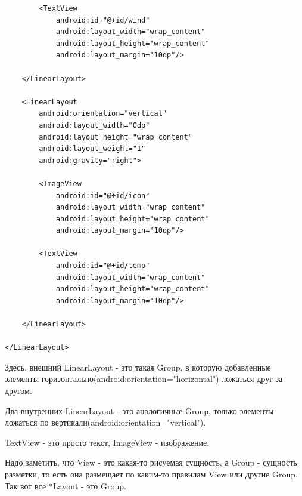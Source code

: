 \documentclass[12 pt]{article}
\begin{document}
\begin{itemize}
\begin{lstlisting}
        <TextView
            android:id="@+id/wind"
            android:layout_width="wrap_content"
            android:layout_height="wrap_content"
            android:layout_margin="10dp"/>

    </LinearLayout>

    <LinearLayout
        android:orientation="vertical"
        android:layout_width="0dp"
        android:layout_height="wrap_content"
        android:layout_weight="1"
        android:gravity="right">
        
        <ImageView
            android:id="@+id/icon"
            android:layout_width="wrap_content"
            android:layout_height="wrap_content"
            android:layout_margin="10dp"/>

        <TextView
            android:id="@+id/temp"
            android:layout_width="wrap_content"
            android:layout_height="wrap_content"
            android:layout_margin="10dp"/>

    </LinearLayout>

</LinearLayout>    
        \end{lstlisting} 
        
        Здесь, внешний LinearLayout - это такая Group, в которую добавленные элементы горизонтально(android:orientation="horizontal") ложаться друг за другом.
        
        Два внутренних LinearLayout - это аналогичные Group, только элементы ложаться по вертикали(android:orientation="vertical").
        
        TextView - это просто текст, ImageView - изображение.
        
        Надо заметить, что View - это какая-то рисуемая сущность, а Group - сущность разметки, то есть она размещает по каким-то правилам View или другие Group. Так вот все *Layout - это Group.
        

\end{itemize}
\end{document}
